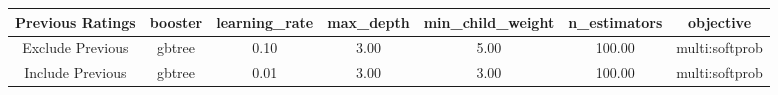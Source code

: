 \footnotesize
\begin{tabular}{ccccccc}
\toprule
Previous Ratings & booster & learning_rate & max_depth & min_child_weight & n_estimators & objective \\
\midrule
Exclude Previous & gbtree & 0.10 & 3.00 & 5.00 & 100.00 & multi:softprob \\
Include Previous & gbtree & 0.01 & 3.00 & 3.00 & 100.00 & multi:softprob \\
\bottomrule
\end{tabular}

\normalsize